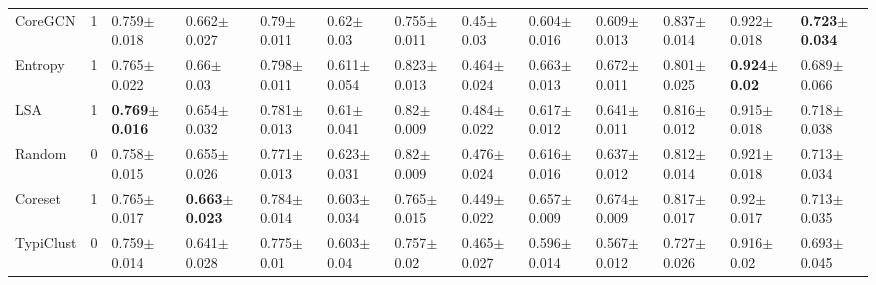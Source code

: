 \documentclass[]{article}
\begin{document}
\begin{table}[H]
{\begin{tabular}{l|clllllllllll}
			CoreGCN & 1 & 0.759$\pm${\small0.018} & 0.662$\pm${\small0.027} & 0.79$\pm${\small0.011} & 0.62$\pm${\small0.03} & 0.755$\pm${\small0.011} & 0.45$\pm${\small0.03} & 0.604$\pm${\small0.016} & 0.609$\pm${\small0.013} & 0.837$\pm${\small0.014} & 0.922$\pm${\small0.018} & \textbf{0.723$\pm${\small0.034}} \\
			Entropy & 1 & 0.765$\pm${\small0.022} & 0.66$\pm${\small0.03} & 0.798$\pm${\small0.011} & 0.611$\pm${\small0.054} & 0.823$\pm${\small0.013} & 0.464$\pm${\small0.024} & 0.663$\pm${\small0.013} & 0.672$\pm${\small0.011} & 0.801$\pm${\small0.025} & \textbf{0.924$\pm${\small0.02}} & 0.689$\pm${\small0.066} \\
			LSA & 1 & \textbf{0.769$\pm${\small0.016}} & 0.654$\pm${\small0.032} & 0.781$\pm${\small0.013} & 0.61$\pm${\small0.041} & 0.82$\pm${\small0.009} & 0.484$\pm${\small0.022} & 0.617$\pm${\small0.012} & 0.641$\pm${\small0.011} & 0.816$\pm${\small0.012} & 0.915$\pm${\small0.018} & 0.718$\pm${\small0.038} \\
			Random & 0 & 0.758$\pm${\small0.015} & 0.655$\pm${\small0.026} & 0.771$\pm${\small0.013} & 0.623$\pm${\small0.031} & 0.82$\pm${\small0.009} & 0.476$\pm${\small0.024} & 0.616$\pm${\small0.016} & 0.637$\pm${\small0.012} & 0.812$\pm${\small0.014} & 0.921$\pm${\small0.018} & 0.713$\pm${\small0.034} \\
			Coreset & 1 & 0.765$\pm${\small0.017} & \textbf{0.663$\pm${\small0.023}} & 0.784$\pm${\small0.014} & 0.603$\pm${\small0.034} & 0.765$\pm${\small0.015} & 0.449$\pm${\small0.022} & 0.657$\pm${\small0.009} & 0.674$\pm${\small0.009} & 0.817$\pm${\small0.017} & 0.92$\pm${\small0.017} & 0.713$\pm${\small0.035} \\
			TypiClust & 0 & 0.759$\pm${\small0.014} & 0.641$\pm${\small0.028} & 0.775$\pm${\small0.01} & 0.603$\pm${\small0.04} & 0.757$\pm${\small0.02} & 0.465$\pm${\small0.027} & 0.596$\pm${\small0.014} & 0.567$\pm${\small0.012} & 0.727$\pm${\small0.026} & 0.916$\pm${\small0.02} & 0.693$\pm${\small0.045}
		\end{tabular}
	}
\end{table}
\end{document}
